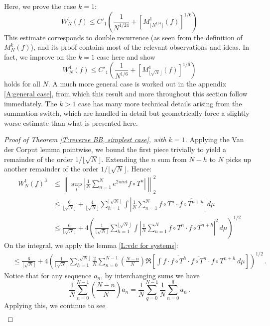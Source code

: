\documentclass[11pt, oneside]{amsart}   	%
\newcommand{\1}{\mathbbm{1}}
\newcommand{\norm}[1]{\left\lVert#1\right\rVert}
\newcommand{\floor}[1]{\lfloor#1\rfloor}
\theoremstyle{definition}
\begin{document}
Here, we prove the case $k=1$:
$$W_N^1(f) \leq C'_1\left( \frac{1}{N^{1/24}} + \left[ M^1_{\floor{N^{1/4}}} (f)\right]^{1/6}\right)$$
This estimate corresponds to double recurrence (as seen from the definition of $M^k_N(f)$), and its proof contains most of the relevant observations and ideas. In fact, we improve on the $k=1$ case here and show
$$W_N^1(f) \leq C'_1\left( \frac{1}{N^{1/6}} + \left[ M^1_{\floor{\sqrt{N}}} (f)\right]^{1/6}\right)$$
holds for all $N$. 
A much more general case is worked out in the appendix \ref{A:general case}, from which this result and more throughout this section follow immediately. The $k>1$ case has many more technical details arising from the summation switch, which are handled in detail but geometrically force a slightly worse estimate than what is presented here.
\begin{proof}[Proof of Theorem \ref{T:reverse BB, simplest case}, with $k=1$]
Applying the Van der Corput lemma pointwise, we bound the first piece trivially to yield a remainder of the order $1/\floor{\sqrt{N}}$. Extending the $n$ sum from $N-h$ to $N$ picks up another remainder of the order $1/\floor{\sqrt{N}}$. Hence:
\begin{align*}
W^1_N(f)^3 &\leq \norm{\sup_t \left|\frac{1}{N} \sum_{n=1}^N e^{2\pi i n t} f\circ T^n \right|}^2_2 \\
&\leq \frac{6}{\floor{\sqrt{N}}} +  \frac{4}{\floor{\sqrt{N}}}\sum_{h=1}^{\floor{\sqrt{N}}} \int \left| \frac{1}{N} \sum_{n=1}^N f \circ T^n \cdot \overline{f \circ T^{n + h}} \right| \, d\mu \\
&\leq \frac{6}{\floor{\sqrt{N}}} +  4\left( \frac{1}{\floor{\sqrt{N}}}\sum_{h=1}^{\floor{\sqrt{N}}} \int \left| \frac{1}{N} \sum_{n=1}^N f \circ T^n \cdot \overline{f \circ T^{n + h}} \right|^2\, d\mu \right)^{1/2}
\end{align*}
On the integral, we apply the lemma \ref{L:vdc for systems}:
\begin{align*}
&\leq \frac{6}{\floor{\sqrt{N}}} +  4\left( \frac{1}{\floor{\sqrt{N}}}\sum_{h=1}^{\floor{\sqrt{N}}} \frac{2}{N} \sum_{n = 0}^{N-1} \left(\frac{N-n}{N}\right)\Re \left[\int f \cdot \overline{f\circ T^{h}} \cdot \overline{f \circ T^n} \cdot f\circ T^{n+h} \, d\mu \right] \right)^{1/2} \, .
\end{align*}
Notice that for any sequence $a_n$, by interchanging sums we have
$$\frac{1}{N}\sum_{n=0}^{N-1} \left( \frac{N-n}{N} \right) a_n = \frac{1}{N}\sum_{q=0}^{N-1} \frac{1}{N}\sum_{n=0}^q a_n\, .$$
Applying this, we continue to see
\begin{align*}

\end{align*}
\end{proof}
\end{document}
